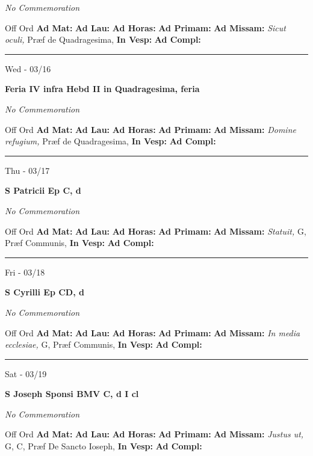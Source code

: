 \documentclass[letterpaper, 10pt]{article}
\begin{document}
\textit{No Commemoration}\begin{justify}
Off Ord
\textbf{Ad Mat: }
\textbf{Ad Lau: }
\textbf{Ad Horas: }
\textbf{Ad Primam: }
\textbf{Ad Missam:} \textit{Sicut oculi, } Præf de Quadragesima, 
\textbf{In Vesp: }
\textbf{Ad Compl: }\end{justify}



\hrule
\begin{center}
Wed - 03/16
\end{center}\textbf{ \large Feria IV infra Hebd II in Quadragesima, \textnormal{\normalsize feria}}

\textit{No Commemoration}\begin{justify}
Off Ord
\textbf{Ad Mat: }
\textbf{Ad Lau: }
\textbf{Ad Horas: }
\textbf{Ad Primam: }
\textbf{Ad Missam:} \textit{Domine refugium, } Præf de Quadragesima, 
\textbf{In Vesp: }
\textbf{Ad Compl: }\end{justify}



\hrule
\begin{center}
Thu - 03/17
\end{center}\textbf{ \large S Patricii Ep C, \textnormal{\normalsize d}}

\textit{No Commemoration}\begin{justify}
Off Ord
\textbf{Ad Mat: }
\textbf{Ad Lau: }
\textbf{Ad Horas: }
\textbf{Ad Primam: }
\textbf{Ad Missam:} \textit{Statuit, } G, Præf Communis, 
\textbf{In Vesp: }
\textbf{Ad Compl: }\end{justify}



\hrule
\begin{center}
Fri - 03/18
\end{center}\textbf{ \large S Cyrilli Ep CD, \textnormal{\normalsize d}}

\textit{No Commemoration}\begin{justify}
Off Ord
\textbf{Ad Mat: }
\textbf{Ad Lau: }
\textbf{Ad Horas: }
\textbf{Ad Primam: }
\textbf{Ad Missam:} \textit{In media ecclesiae, } G, Præf Communis, 
\textbf{In Vesp: }
\textbf{Ad Compl: }\end{justify}



\hrule
\begin{center}
Sat - 03/19
\end{center}\textbf{ \large S Joseph Sponsi BMV C, \textnormal{\normalsize d I cl}}

\textit{No Commemoration}\begin{justify}
Off Ord
\textbf{Ad Mat: }
\textbf{Ad Lau: }
\textbf{Ad Horas: }
\textbf{Ad Primam: }
\textbf{Ad Missam:} \textit{Justus ut, } G, C, Præf De Sancto Ioseph, 
\textbf{In Vesp: }
\textbf{Ad Compl: }\end{justify}
\end{document}
